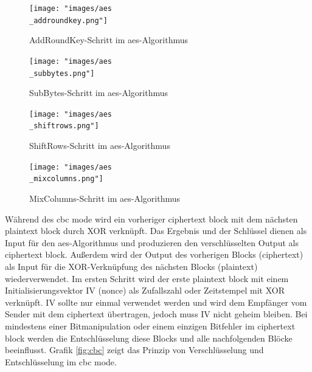 \begin{figure}[!htbp]
	\centering
	\texttt{[image: "images/aes\\\_addroundkey.png"]}
	\caption{AddRoundKey-Schritt im \gls{aes}-Algorithmus \cite{wiki-aes}}
	\label{fig:aes-addk}
\end{figure}

\begin{figure}[!htbp]
	\centering
	\texttt{[image: "images/aes\\\_subbytes.png"]}
	\caption{SubBytes-Schritt im \gls{aes}-Algorithmus \cite{wiki-aes}}
	\label{fig:aes-sub}
\end{figure}

\begin{figure}[!htbp]
	\centering
	\texttt{[image: "images/aes\\\_shiftrows.png"]}
	\caption{ShiftRows-Schritt im \gls{aes}-Algorithmus \cite{wiki-aes}}
	\label{fig:aes-shift}
\end{figure}

\begin{figure}[!htbp]
	\centering
	\texttt{[image: "images/aes\\\_mixcolumns.png"]}
	\caption{MixColumns-Schritt im \gls{aes}-Algorithmus \cite{wiki-aes}}
	\label{fig:aes-mix}
\end{figure}

Während des \gls{cbc} mode wird ein vorheriger ciphertext block mit dem nächsten plaintext block durch XOR verknüpft. Das Ergebnis und der Schlüssel dienen als Input für den \gls{aes}-Algorithmus und produzieren den verschlüsselten Output als ciphertext block. Außerdem wird der Output des vorherigen Blocks (ciphertext) als Input für die XOR-Verknüpfung des nächsten Blocks (plaintext) wiederverwendet. Im ersten Schritt wird der erste plaintext block mit einem Initialisierungsvektor IV (nonce) als Zufallszahl oder Zeitstempel mit XOR verknüpft. IV sollte nur einmal verwendet werden und wird dem Empfänger vom Sender mit dem ciphertext übertragen, jedoch muss IV nicht geheim bleiben. Bei mindestens einer Bitmanipulation oder einem einzigen Bitfehler im ciphertext block werden die Entschlüsselung diese Blocks und alle nachfolgenden Blöcke beeinflusst. Grafik \ref{fig:cbc} zeigt das Prinzip von Verschlüsselung und Entschlüsselung im \gls{cbc} mode. \\

